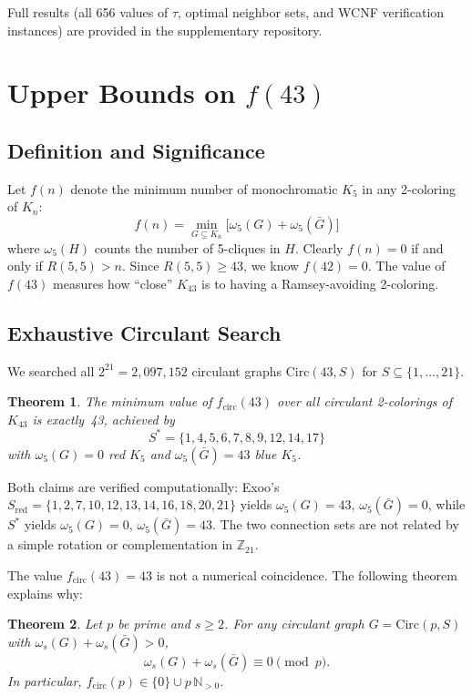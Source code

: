 \documentclass[11pt,a4paper]{article}
\newtheorem{theorem}{Theorem}
\theoremstyle{definition}
\theoremstyle{remark}
\newcommand{\Kn}[1]{K_{#1}}
\begin{document}
Full results (all 656 values of $\tau$, optimal neighbor sets,
and WCNF verification instances) are provided in the
supplementary repository.

\section{Upper Bounds on $f(43)$}
\label{sec:f43}

\subsection{Definition and Significance}

Let $f(n)$ denote the minimum number of monochromatic $K_5$
in any 2-coloring of $\Kn{n}$:
\[
  f(n) = \min_{G \subseteq \Kn{n}}
    \bigl[\omega_5(G) + \omega_5(\bar{G})\bigr]
\]
where $\omega_5(H)$ counts the number of 5-cliques in $H$.
Clearly $f(n) = 0$ if and only if $R(5,5) > n$.
Since $R(5,5) \geq 43$, we know $f(42) = 0$.
The value of $f(43)$ measures how ``close'' $\Kn{43}$ is
to having a Ramsey-avoiding 2-coloring.

\subsection{Exhaustive Circulant Search}

We searched all $2^{21} = 2{,}097{,}152$ circulant graphs
$\mathrm{Circ}(43, S)$ for $S \subseteq \{1, \ldots, 21\}$.

\begin{theorem}
The minimum value of $f_{\mathrm{circ}}(43)$ over all circulant
2-colorings of $\Kn{43}$ is exactly~43, achieved by
\[
  S^* = \{1, 4, 5, 6, 7, 8, 9, 12, 14, 17\}
\]
with $\omega_5(G) = 0$ red $K_5$ and $\omega_5(\bar{G}) = 43$
blue $K_5$.
\end{theorem}

Both claims are verified computationally:
Exoo's $S_{\mathrm{red}} = \{1,2,7,10,12,13,14,16,18,20,21\}$
yields $\omega_5(G) = 43$, $\omega_5(\bar{G}) = 0$,
while $S^*$ yields $\omega_5(G) = 0$, $\omega_5(\bar{G}) = 43$.
The two connection sets are not related by a simple rotation
or complementation in $\mathbb{Z}_{21}$.

The value $f_{\mathrm{circ}}(43) = 43$ is not a numerical coincidence.
The following theorem explains why:

\begin{theorem}\label{thm:fcirc-mod-p}
Let $p$ be prime and $s \geq 2$.  For any circulant graph
$G = \mathrm{Circ}(p, S)$ with $\omega_s(G) + \omega_s(\bar{G}) > 0$,
\[
  \omega_s(G) + \omega_s(\bar{G}) \equiv 0 \pmod{p}.
\]
In particular, $f_{\mathrm{circ}}(p) \in \{0\} \cup p\,\mathbb{N}_{> 0}$.
\end{theorem}
\end{document}
